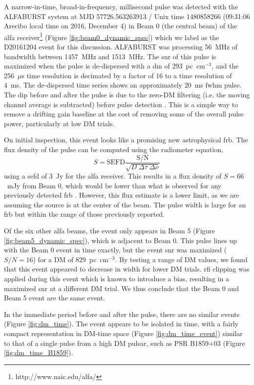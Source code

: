 \documentclass[a4paper,fleqn,usenatbib]{mnras}
\begin{document}
A narrow-in-time, broad-in-frequency, millisecond pulse was detected with the
ALFABURST system at MJD 57726.563263913 / Unix time 1480858266 (09:31:06 Arecibo
local time on 2016, December 4) in Beam 0 (the central beam) of the \gls{alfa}
receiver\footnote{http://www.naic.edu/alfa/} (Figure
\ref{fig:beam0_dynamic_spec}) which we label as the D20161204 event for this
discussion. ALFABURST was processing 56~MHz of bandwidth between 1457~MHz and
1513~MHz. The \gls{snr} of this pulse is maximized when the pulse is de-dispersed
with a \gls{dm} of 293~pc~cm$^{-3}$, and the 256~$\mu$s time resolution is decimated
by a factor of 16 to a time resolution of 4~ms. The de-dispersed time series shows
an approximately 20~ms \gls{fwhm} pulse.  The dip before and after the pulse is
due to the zero-DM filtering (i.e. the moving channel average is subtracted) before
pulse detection \citep{2009MNRAS.395..410E}. This is a simple way to remove a
drifting gain baseline at the cost of removing some of the overall pulse power,
particularly at low DM trials.

On initial inspection, this event looks like a promising new astrophysical
\gls{frb}. The flux density of the pulse can be computed using the radiometer
equation,
%
$$
S = \textrm{SEFD} \frac{\textrm{S/N}}{\sqrt{D \; \Delta \tau \;
\Delta \nu}}
$$
%
using a \gls{sefd} of 3~Jy for the \gls{alfa} receiver. This results in a flux
density of \mbox{$S = 66$}~mJy from Beam 0, which would be lower than what is observed for any
previously detected \gls{frb} \citep{2016PASA...33...45P}. However, this flux
estimate is a lower limit, as we are assuming the source is at the center of the
beam. The pulse width is large for an \gls{frb} but within the range of those
previously reported.

Of the six other \gls{alfa} beams, the event only appears in Beam 5 (Figure
\ref{fig:beam5_dynamic_spec}), which is adjacent to Beam 0.  This pulse lines up
with the Beam 0 event in time exactly, but the event \gls{snr} was maximized
($S/N=16$) for a DM of 829~pc~cm$^{-3}$. By testing a range of DM values, we
found that this event appeared to decrease in width for lower DM trials.
\gls{rfi} clipping was applied during this event which is known to introduce a
bias, resulting in a maximized \gls{snr} at a different DM trial.  We thus conclude
that the Beam 0 and Beam 5 event are the same event.

In the immediate period before and after the pulse, there are no similar events
(Figure \ref{fig:dm_time}). The event appears to be isolated in time, with a
fairly compact representation in DM-time space (Figure \ref{fig:dm_time_event})
similar to that of a single pulse from a high DM pulsar, such as PSR B1859+03
(Figure \ref{fig:dm_time_B1859}).
\end{document}
